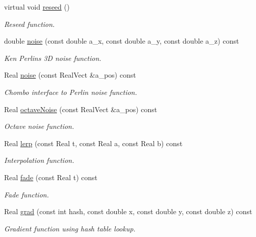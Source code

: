 \begin{DoxyCompactItemize}
\item 
virtual void \hyperlink{classperlin__if_a26a4c6c866b19a8495f003c266159174}{reseed} ()
\begin{DoxyCompactList}\small\item\em Reseed function. \end{DoxyCompactList}\item 
double \hyperlink{classperlin__if_a88ad58e2e891b8402af937a343a94f2b}{noise} (const double a\+\_\+x, const double a\+\_\+y, const double a\+\_\+z) const 
\begin{DoxyCompactList}\small\item\em Ken Perlin\textquotesingle{}s 3D noise function. \end{DoxyCompactList}\item 
Real \hyperlink{classperlin__if_acec0e7b8b48b22a0094b620743bcc1b3}{noise} (const Real\+Vect \&a\+\_\+pos) const 
\begin{DoxyCompactList}\small\item\em Chombo interface to Perlin noise function. \end{DoxyCompactList}\item 
Real \hyperlink{classperlin__if_aba9271ab3017eeb212d8a4bb5212990c}{octave\+Noise} (const Real\+Vect \&a\+\_\+pos) const 
\begin{DoxyCompactList}\small\item\em Octave noise function. \end{DoxyCompactList}\item 
Real \hyperlink{classperlin__if_af77a158cd6c60ceaf5c7779b62d11b16}{lerp} (const Real t, const Real a, const Real b) const 
\begin{DoxyCompactList}\small\item\em Interpolation function. \end{DoxyCompactList}\item 
Real \hyperlink{classperlin__if_a8fd23bab717fe28009908ec0fd2efaed}{fade} (const Real t) const 
\begin{DoxyCompactList}\small\item\em Fade function. \end{DoxyCompactList}\item 
Real \hyperlink{classperlin__if_a21ad029122632390b045a51d136a3c7e}{grad} (const int hash, const double x, const double y, const double z) const 
\begin{DoxyCompactList}\small\item\em Gradient function using hash table lookup. \end{DoxyCompactList}\end{DoxyCompactItemize}

